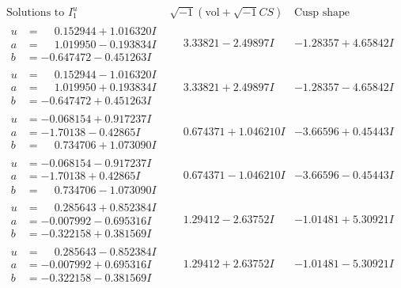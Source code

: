 \documentclass[1p]{elsarticle_modified}
\theoremstyle{definition}
\newcommand{\I}{\sqrt{-1}}
\begin{document}
$$\begin{array}{c|c|c}  
\text{Solutions to }I^u_{1}& \I (\text{vol} + \sqrt{-1}CS) & \text{Cusp shape}\\
 \hline 
\begin{aligned}
u &= \phantom{-}0.152944 + 1.016320 I \\
a &= \phantom{-}1.019950 - 0.193834 I \\
b &= -0.647472 - 0.451263 I\end{aligned}
 & \phantom{-}3.33821 - 2.49897 I & -1.28357 + 4.65842 I \\ \hline\begin{aligned}
u &= \phantom{-}0.152944 - 1.016320 I \\
a &= \phantom{-}1.019950 + 0.193834 I \\
b &= -0.647472 + 0.451263 I\end{aligned}
 & \phantom{-}3.33821 + 2.49897 I & -1.28357 - 4.65842 I \\ \hline\begin{aligned}
u &= -0.068154 + 0.917237 I \\
a &= -1.70138 - 0.42865 I \\
b &= \phantom{-}0.734706 + 1.073090 I\end{aligned}
 & \phantom{-}0.674371 + 1.046210 I & -3.66596 + 0.45443 I \\ \hline\begin{aligned}
u &= -0.068154 - 0.917237 I \\
a &= -1.70138 + 0.42865 I \\
b &= \phantom{-}0.734706 - 1.073090 I\end{aligned}
 & \phantom{-}0.674371 - 1.046210 I & -3.66596 - 0.45443 I \\ \hline\begin{aligned}
u &= \phantom{-}0.285643 + 0.852384 I \\
a &= -0.007992 - 0.695316 I \\
b &= -0.322158 + 0.381569 I\end{aligned}
 & \phantom{-}1.29412 - 2.63752 I & -1.01481 + 5.30921 I \\ \hline\begin{aligned}
u &= \phantom{-}0.285643 - 0.852384 I \\
a &= -0.007992 + 0.695316 I \\
b &= -0.322158 - 0.381569 I\end{aligned}
 & \phantom{-}1.29412 + 2.63752 I & -1.01481 - 5.30921 I \\ \hline\begin{aligned}

\end{aligned}
\end{array}$$
\end{document}
